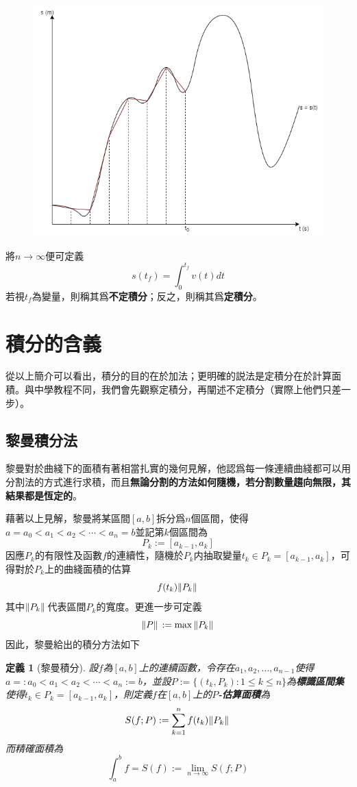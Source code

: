\documentclass[12pt]{article}
\newtheorem{definition}{定義}
\begin{document}
    \begin{figure}[H]
        \centering
        \includegraphics[scale=0.6]{partition s-t.png}
    \end{figure}

    將$n\to\infty$便可定義$$s(t_f)=\int_{0}^{t_f}v(t)dt$$若視$t_f$為變量，則稱其爲\textbf{不定積分}；反之，則稱其爲\textbf{定積分}。
    
    \section*{積分的含義}
    從以上簡介可以看出，積分的目的在於加法；更明確的説法是定積分在於計算面積。與中學教程不同，我們會先觀察定積分，再闡述不定積分（實際上他們只差一步）。

    \subsection*{黎曼積分法}
    黎曼對於曲綫下的面積有著相當扎實的幾何見解，他認爲每一條連續曲綫都可以用分割法的方式進行求積，而且\textbf{無論分割的方法如何隨機，若分割數量趨向無限，其結果都是恆定的}。

    藉著以上見解，黎曼將某區間$[a,b]$拆分爲$n$個區間，使得$a=a_0<a_1<a_2<\cdots<a_n=b$並記第$k$個區間為$$P_k:=[a_{k-1},a_k]$$因應$P_k$的有限性及函數$f$的連續性，隨機於$P_k$内抽取變量$t_k\in P_k=[a_{k-1},a_k]$，可得對於$P_k$上的曲綫面積的估算$$f(t_k)\norm*{P_k}$$其中$\norm*{P_k}$代表區間$P_k$的寬度。更進一步可定義$$\norm*{P}:=\max{\norm*{P_k}}$$因此，黎曼給出的積分方法如下

    \begin{definition}[黎曼積分]
        設$f$為$[a,b]$上的連續函數，令存在$a_1,a_2,\dots,a_{n-1}$使得$a=:a_0<a_1<a_2<\cdots<a_n:=b$，並設$P:=\{(t_k,P_k):1\leq k\leq n\}$為\textbf{標識區間集}使得$t_k\in P_k=[a_{k-1},a_k]$，則定義$f$在$[a,b]$上的\textbf{$P$-估算面積}為$$S(f;P):=\sum_{k=1}^{n}f(t_k)\norm*{P_k}$$
        而精確面積為$$\int_{a}^{b}f=S(f):=\lim_{n\to \infty}S(f;P)$$
    \end{definition}
\end{document}
